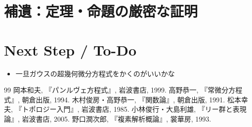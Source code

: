 \documentclass[paper=a4, fontsize=11pt]{jlreq} %
\theoremstyle{break}
\theoremstyle{qa}
\theoremstyle{remark} %
\begin{document}
\section{補遺：定理・命題の厳密な証明}


\section{Next Step / To-Do}
\begin{itemize}
    \item [-] 一旦ガウスの超幾何微分方程式をかくのがいいかな
\end{itemize}

\begin{thebibliography}{99}
     岡本和夫, 『パンルヴェ方程式』, 岩波書店, 1999.
     高野恭一, 『常微分方程式』, 朝倉出版, 1994.
     木村俊房・高野恭一, 『関数論』, 朝倉出版, 1991.
     松本幸夫, 『トポロジー入門』, 岩波書店, 1985.
     小林俊行・大島利雄, 『リー群と表現論』, 岩波書店, 2005.
     野口潤次郎, 『複素解析概論』, 裳華房, 1993.
\end{thebibliography}
\end{document}
